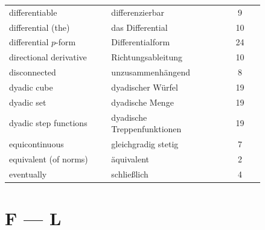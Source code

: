 \begin{center}
\begin{tabular}{@{}p{0.40\linewidth} p{0.44\linewidth} c@{}}
differentiable & differenzierbar & 9 \\
differential (the) & das Differential & 10 \\
differential $p$-form & Differentialform & 24 \\
directional derivative & Richtungsableitung & 10 \\
disconnected & unzusammenhängend & 8 \\
dyadic cube & dyadischer Würfel & 19 \\
dyadic set & dyadische Menge & 19 \\
dyadic step functions & dyadische Treppenfunktionen & 19 \\
equicontinuous & gleichgradig stetig & 7 \\
equivalent (of norms) & äquivalent & 2 \\
eventually & schließlich & 4 \\
\end{tabular}
\end{center}

\section*{F --- L}


